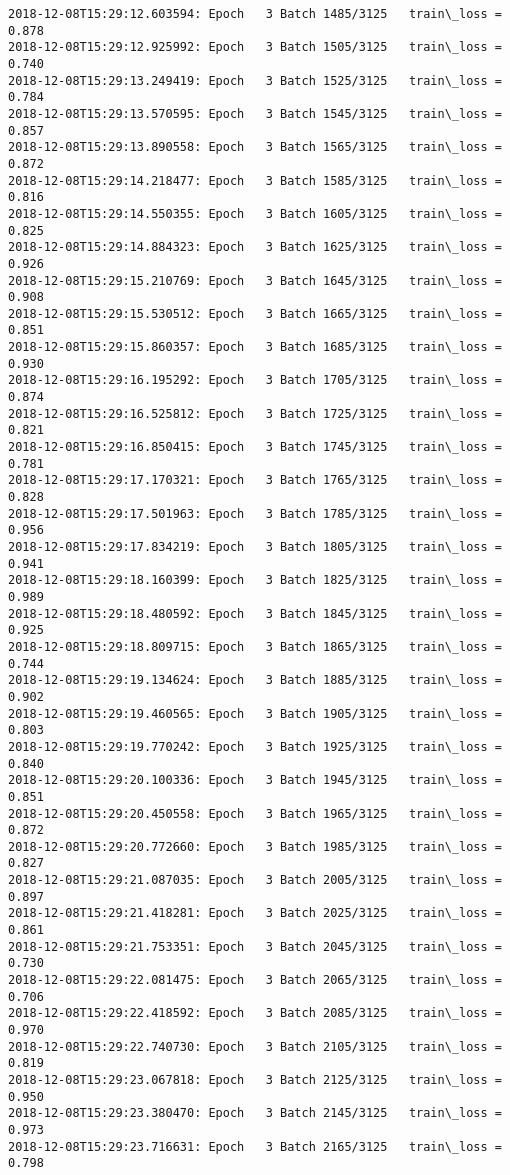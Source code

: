 \documentclass[11pt]{article}
\begin{document}
\begin{Verbatim}[commandchars=\\\{\}]
2018-12-08T15:29:12.603594: Epoch   3 Batch 1485/3125   train\_loss = 0.878
2018-12-08T15:29:12.925992: Epoch   3 Batch 1505/3125   train\_loss = 0.740
2018-12-08T15:29:13.249419: Epoch   3 Batch 1525/3125   train\_loss = 0.784
2018-12-08T15:29:13.570595: Epoch   3 Batch 1545/3125   train\_loss = 0.857
2018-12-08T15:29:13.890558: Epoch   3 Batch 1565/3125   train\_loss = 0.872
2018-12-08T15:29:14.218477: Epoch   3 Batch 1585/3125   train\_loss = 0.816
2018-12-08T15:29:14.550355: Epoch   3 Batch 1605/3125   train\_loss = 0.825
2018-12-08T15:29:14.884323: Epoch   3 Batch 1625/3125   train\_loss = 0.926
2018-12-08T15:29:15.210769: Epoch   3 Batch 1645/3125   train\_loss = 0.908
2018-12-08T15:29:15.530512: Epoch   3 Batch 1665/3125   train\_loss = 0.851
2018-12-08T15:29:15.860357: Epoch   3 Batch 1685/3125   train\_loss = 0.930
2018-12-08T15:29:16.195292: Epoch   3 Batch 1705/3125   train\_loss = 0.874
2018-12-08T15:29:16.525812: Epoch   3 Batch 1725/3125   train\_loss = 0.821
2018-12-08T15:29:16.850415: Epoch   3 Batch 1745/3125   train\_loss = 0.781
2018-12-08T15:29:17.170321: Epoch   3 Batch 1765/3125   train\_loss = 0.828
2018-12-08T15:29:17.501963: Epoch   3 Batch 1785/3125   train\_loss = 0.956
2018-12-08T15:29:17.834219: Epoch   3 Batch 1805/3125   train\_loss = 0.941
2018-12-08T15:29:18.160399: Epoch   3 Batch 1825/3125   train\_loss = 0.989
2018-12-08T15:29:18.480592: Epoch   3 Batch 1845/3125   train\_loss = 0.925
2018-12-08T15:29:18.809715: Epoch   3 Batch 1865/3125   train\_loss = 0.744
2018-12-08T15:29:19.134624: Epoch   3 Batch 1885/3125   train\_loss = 0.902
2018-12-08T15:29:19.460565: Epoch   3 Batch 1905/3125   train\_loss = 0.803
2018-12-08T15:29:19.770242: Epoch   3 Batch 1925/3125   train\_loss = 0.840
2018-12-08T15:29:20.100336: Epoch   3 Batch 1945/3125   train\_loss = 0.851
2018-12-08T15:29:20.450558: Epoch   3 Batch 1965/3125   train\_loss = 0.872
2018-12-08T15:29:20.772660: Epoch   3 Batch 1985/3125   train\_loss = 0.827
2018-12-08T15:29:21.087035: Epoch   3 Batch 2005/3125   train\_loss = 0.897
2018-12-08T15:29:21.418281: Epoch   3 Batch 2025/3125   train\_loss = 0.861
2018-12-08T15:29:21.753351: Epoch   3 Batch 2045/3125   train\_loss = 0.730
2018-12-08T15:29:22.081475: Epoch   3 Batch 2065/3125   train\_loss = 0.706
2018-12-08T15:29:22.418592: Epoch   3 Batch 2085/3125   train\_loss = 0.970
2018-12-08T15:29:22.740730: Epoch   3 Batch 2105/3125   train\_loss = 0.819
2018-12-08T15:29:23.067818: Epoch   3 Batch 2125/3125   train\_loss = 0.950
2018-12-08T15:29:23.380470: Epoch   3 Batch 2145/3125   train\_loss = 0.973
2018-12-08T15:29:23.716631: Epoch   3 Batch 2165/3125   train\_loss = 0.798

\end{Verbatim}
\end{document}
